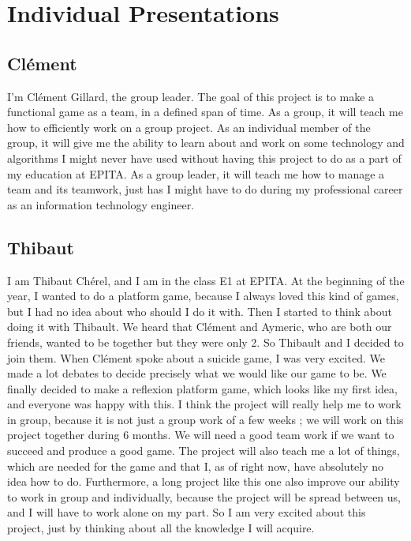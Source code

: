 \documentclass[twoside,12pt]{report}	%
\begin{document}
	\chapter{Individual Presentations}

		\section{Clément}

			I'm Clément Gillard, the group leader. The goal of this project is to make a functional game as a team, in a defined span of time. As a group, it will teach me how to efficiently work on a group project. As an individual member of the group, it will give me the ability to learn about and work on some technology and algorithms I might never have used without having this project to do as a part of my education at EPITA. As a group leader, it will teach me how to manage a team and its teamwork, just has I might have to do during my professional career as an information technology engineer.

		\section{Thibaut}

			I am Thibaut Chérel, and I am in the class E1 at EPITA. At the beginning of the year, I wanted to do a platform game, because I always loved this kind of games, but I had no idea about who should I do it with. Then I started to think about doing it with Thibault. We heard that Clément and Aymeric, who are both our friends, wanted to be together but they were only 2. So Thibault and I decided to join them. When Clément spoke about a suicide game, I was very excited. We made a lot debates to decide precisely what we would like our game to be. We finally decided to make a reflexion platform game, which looks like my first idea, and everyone was happy with this. I think the project will really help me to work in group, because it is not just a group work of a few weeks ; we will work on this project together during 6 months. We will need a good team work if we want to succeed and produce a good game. The project will also teach me a lot of things, which are needed for the game and that I, as of right now, have absolutely no idea how to do. Furthermore, a long project like this one also improve our ability to work in group and individually, because the project will be spread between us, and I will have to work alone on my part. So I am very excited about this project, just by thinking about all the knowledge I will acquire.
\end{document}
